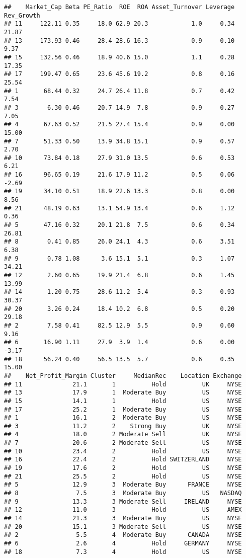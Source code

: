 \documentclass[
]{article}
\begin{document}
\begin{verbatim}
##    Market_Cap Beta PE_Ratio  ROE  ROA Asset_Turnover Leverage Rev_Growth
## 11     122.11 0.35     18.0 62.9 20.3            1.0     0.34      21.87
## 13     173.93 0.46     28.4 28.6 16.3            0.9     0.10       9.37
## 15     132.56 0.46     18.9 40.6 15.0            1.1     0.28      17.35
## 17     199.47 0.65     23.6 45.6 19.2            0.8     0.16      25.54
## 1       68.44 0.32     24.7 26.4 11.8            0.7     0.42       7.54
## 3        6.30 0.46     20.7 14.9  7.8            0.9     0.27       7.05
## 4       67.63 0.52     21.5 27.4 15.4            0.9     0.00      15.00
## 7       51.33 0.50     13.9 34.8 15.1            0.9     0.57       2.70
## 10      73.84 0.18     27.9 31.0 13.5            0.6     0.53       6.21
## 16      96.65 0.19     21.6 17.9 11.2            0.5     0.06      -2.69
## 19      34.10 0.51     18.9 22.6 13.3            0.8     0.00       8.56
## 21      48.19 0.63     13.1 54.9 13.4            0.6     1.12       0.36
## 5       47.16 0.32     20.1 21.8  7.5            0.6     0.34      26.81
## 8        0.41 0.85     26.0 24.1  4.3            0.6     3.51       6.38
## 9        0.78 1.08      3.6 15.1  5.1            0.3     1.07      34.21
## 12       2.60 0.65     19.9 21.4  6.8            0.6     1.45      13.99
## 14       1.20 0.75     28.6 11.2  5.4            0.3     0.93      30.37
## 20       3.26 0.24     18.4 10.2  6.8            0.5     0.20      29.18
## 2        7.58 0.41     82.5 12.9  5.5            0.9     0.60       9.16
## 6       16.90 1.11     27.9  3.9  1.4            0.6     0.00      -3.17
## 18      56.24 0.40     56.5 13.5  5.7            0.6     0.35      15.00
##    Net_Profit_Margin Cluster     MedianRec    Location Exchange
## 11              21.1       1          Hold          UK     NYSE
## 13              17.9       1  Moderate Buy          US     NYSE
## 15              14.1       1          Hold          US     NYSE
## 17              25.2       1  Moderate Buy          US     NYSE
## 1               16.1       2  Moderate Buy          US     NYSE
## 3               11.2       2    Strong Buy          UK     NYSE
## 4               18.0       2 Moderate Sell          UK     NYSE
## 7               20.6       2 Moderate Sell          US     NYSE
## 10              23.4       2          Hold          US     NYSE
## 16              22.4       2          Hold SWITZERLAND     NYSE
## 19              17.6       2          Hold          US     NYSE
## 21              25.5       2          Hold          US     NYSE
## 5               12.9       3  Moderate Buy      FRANCE     NYSE
## 8                7.5       3  Moderate Buy          US   NASDAQ
## 9               13.3       3 Moderate Sell     IRELAND     NYSE
## 12              11.0       3          Hold          US     AMEX
## 14              21.3       3  Moderate Buy          US     NYSE
## 20              15.1       3 Moderate Sell          US     NYSE
## 2                5.5       4  Moderate Buy      CANADA     NYSE
## 6                2.6       4          Hold     GERMANY     NYSE
## 18               7.3       4          Hold          US     NYSE
\end{verbatim}
\end{document}
